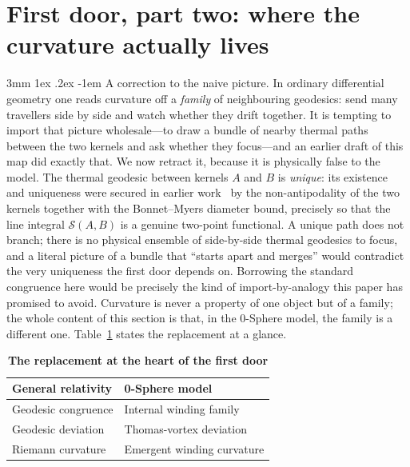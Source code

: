 \documentclass[%
 reprint, amsmath,amssymb, aps, prb, ]{revtex4-2}
\makeatletter
\numberwithin{equation}{section}
\renewcommand\paragraph{%
  \@startsection{paragraph}{4}{\z@}%
    {3mm \@plus 1ex \@minus .2ex}%
    {-1em}%
    {\normalfont\normalsize\itshape}}
\makeatother
\begin{document}
\section{First door, part two: where the curvature actually lives}
\label{sec:bundle}

\paragraph{A correction to the naive picture.}
In ordinary differential geometry one reads curvature off a \emph{family} of neighbouring geodesics: send many travellers side by side and watch whether they drift together. It is tempting to import that picture wholesale---to draw a bundle of nearby thermal paths between the two kernels and ask whether they focus---and an earlier draft of this map did exactly that. We now retract it, because it is physically false to the model. The thermal geodesic between kernels $A$ and $B$ is \emph{unique}: its existence and uniqueness were secured in earlier work~\cite{hanamura51} by the non-antipodality of the two kernels together with the Bonnet--Myers diameter bound, precisely so that the line integral $\mathcal{S}(A,B)$ is a genuine two-point functional. A unique path does not branch; there is no physical ensemble of side-by-side thermal geodesics to focus, and a literal picture of a bundle that ``starts apart and merges'' would contradict the very uniqueness the first door depends on. Borrowing the standard congruence here would be precisely the kind of import-by-analogy this paper has promised to avoid. Curvature is never a property of one object but of a family; the whole content of this section is that, in the 0-Sphere model, the family is a different one. Table~\ref{tab:replacement} states the replacement at a glance.

\begin{table}[h!]
\centering
\caption{\textbf{The replacement at the heart of the first door}}
\label{tab:replacement}
\renewcommand{\arraystretch}{1.35}
\begin{tabular}{p{3.7cm}p{3.9cm}}
\toprule
\textbf{General relativity} & \textbf{0-Sphere model} \\
\midrule
Geodesic congruence & Internal winding family \\
\addlinespace[0.15cm]
Geodesic deviation & Thomas-vortex deviation \\
\addlinespace[0.15cm]
Riemann curvature & Emergent winding curvature \\
\bottomrule
\end{tabular}
\end{table}
\end{document}
